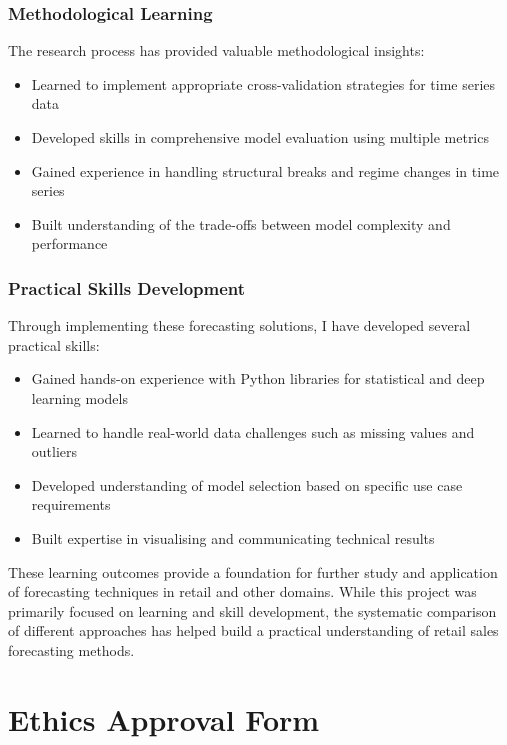 \documentclass[12pt,a4paper]{report}
\begin{document}
\subsection{Methodological Learning}
The research process has provided valuable methodological insights:
\begin{itemize}
    \item Learned to implement appropriate cross-validation strategies for time series data
    \item Developed skills in comprehensive model evaluation using multiple metrics
    \item Gained experience in handling structural breaks and regime changes in time series
    \item Built understanding of the trade-offs between model complexity and performance
\end{itemize}

\subsection{Practical Skills Development}
Through implementing these forecasting solutions, I have developed several practical skills:
\begin{itemize}
    \item Gained hands-on experience with Python libraries for statistical and deep learning models
    \item Learned to handle real-world data challenges such as missing values and outliers
    \item Developed understanding of model selection based on specific use case requirements
    \item Built expertise in visualising and communicating technical results
\end{itemize}

These learning outcomes provide a foundation for further study and application of forecasting techniques in retail and other domains. While this project was primarily focused on learning and skill development, the systematic comparison of different approaches has helped build a practical understanding of retail sales forecasting methods.

\cleardoublepage
{}
{}



\cleardoublepage
{}
\appendix
{}
\chapter{Ethics Approval Form}
\end{document}
